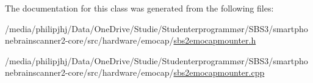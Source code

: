 The documentation for this class was generated from the following files\-:\begin{DoxyCompactItemize}
\item 
/media/philipjhj/\-Data/\-One\-Drive/\-Studie/\-Studenterprogrammør/\-S\-B\-S3/smartphonebrainscanner2-\/core/src/hardware/emocap/\hyperlink{sbs2emocapmounter_8h}{sbs2emocapmounter.\-h}\item 
/media/philipjhj/\-Data/\-One\-Drive/\-Studie/\-Studenterprogrammør/\-S\-B\-S3/smartphonebrainscanner2-\/core/src/hardware/emocap/\hyperlink{sbs2emocapmounter_8cpp}{sbs2emocapmounter.\-cpp}\end{DoxyCompactItemize}
